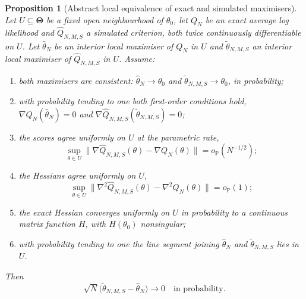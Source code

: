 \documentclass[11pt]{article}
\newtheorem{proposition}[proposition]{Proposition}
\theoremstyle{definition}
\newcommand{\Pp}{\mathbb{P}}
\newcommand{\ThetaSet}{\boldsymbol{\Theta}}
\newcommand{\thetao}{\theta_0}
\begin{document}
\begin{proposition}[Abstract local equivalence of exact and simulated maximisers]\label{prop:m_estimator}
Let $U\subseteq\ThetaSet$ be a fixed open neighbourhood of $\thetao$, let $Q_N$ be an exact average log likelihood and $\widehat Q_{N,M,S}$ a simulated criterion, both twice continuously differentiable on $U$. Let $\widehat\theta_N$ be an interior local maximiser of $Q_N$ in $U$ and $\widetilde\theta_{N,M,S}$ an interior local maximiser of $\widehat Q_{N,M,S}$ in $U$. Assume:
\begin{enumerate}[label=(\roman*)]
\item\label{it:me_consist} both maximisers are consistent: $\widehat\theta_N\to\thetao$ and $\widetilde\theta_{N,M,S}\to\thetao$, in probability;
\item\label{it:me_foc} with probability tending to one both first-order conditions hold,
$\nabla Q_N(\widehat\theta_N)=0$ and $\nabla\widehat Q_{N,M,S}(\widetilde\theta_{N,M,S})=0$;
\item\label{it:me_score} the scores agree uniformly on $U$ at the parametric rate,
\[
\sup_{\theta\in U}
\bigl\|\nabla\widehat Q_{N,M,S}(\theta)-\nabla Q_N(\theta)\bigr\|
=o_{\Pp}(N^{-1/2});
\]
\item\label{it:me_hess} the Hessians agree uniformly on $U$,
\[
\sup_{\theta\in U}
\bigl\|\nabla^2\widehat Q_{N,M,S}(\theta)-\nabla^2Q_N(\theta)\bigr\|
=o_{\Pp}(1);
\]
\item\label{it:me_limit} the exact Hessian converges uniformly on $U$ in probability to a continuous matrix function $H$, with $H(\thetao)$ nonsingular;
\item\label{it:me_segment} with probability tending to one the line segment joining $\widehat\theta_N$ and $\widetilde\theta_{N,M,S}$ lies in $U$.
\end{enumerate}
Then
\[
\sqrt N\bigl(\widetilde\theta_{N,M,S}-\widehat\theta_N\bigr)\to0
\quad\text{in probability}.
\]
\end{proposition}
\end{document}
